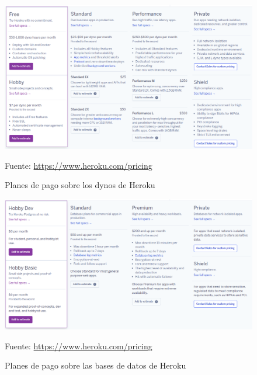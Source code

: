\begin{itemize}
\begin{figure}[H]
\centering
\includegraphics[width=1.0\textwidth]{imagenes/05_Gestion/planes_dynos_heroku.png}
\begin{center}
Fuente: \url{https://www.heroku.com/pricing}
\end{center}
\caption{Planes de pago sobre los dynos de Heroku}
\label{fig:planes_dynos_heroku}
\end{figure}

\begin{figure}[H]
\centering
\includegraphics[width=1.0\textwidth]{imagenes/05_Gestion/planes_postgres_heroku.png}
\begin{center}
Fuente: \url{https://www.heroku.com/pricing}
\end{center}
\caption{Planes de pago sobre las bases de datos de Heroku}
\label{fig:planes_postgres_heroku}
\end{figure}


\end{itemize}
